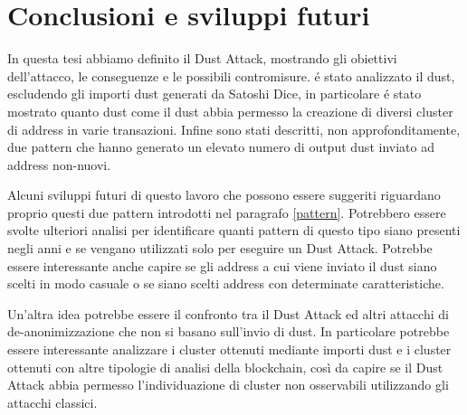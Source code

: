 \chapter{Conclusioni e sviluppi futuri}
In questa tesi abbiamo definito il Dust Attack, mostrando gli obiettivi dell'attacco, le conseguenze e le possibili contromisure. é stato analizzato il dust, escludendo gli importi dust generati da Satoshi Dice, in particolare é stato mostrato quanto dust come il dust abbia permesso la creazione di diversi cluster di address in varie transazioni. Infine sono stati descritti, non approfonditamente, due pattern che hanno generato un elevato numero di output dust inviato ad address non-nuovi. 

Alcuni sviluppi futuri di questo lavoro che possono essere suggeriti riguardano proprio questi due pattern introdotti nel paragrafo \ref{pattern}. Potrebbero essere svolte ulteriori analisi per identificare quanti pattern di questo tipo siano presenti negli anni e se vengano utilizzati solo per eseguire un Dust Attack. Potrebbe essere interessante anche capire se gli address a cui viene inviato il dust siano scelti in modo casuale o se siano scelti address con determinate caratteristiche. 

Un'altra idea potrebbe essere il confronto tra il Dust Attack ed altri attacchi di de-anonimizzazione che non si basano sull'invio di dust. In particolare potrebbe essere interessante analizzare i cluster ottenuti mediante importi dust e i cluster ottenuti con altre tipologie di analisi della blockchain, così da capire se il Dust Attack abbia permesso l'individuazione di cluster non osservabili utilizzando gli attacchi classici.